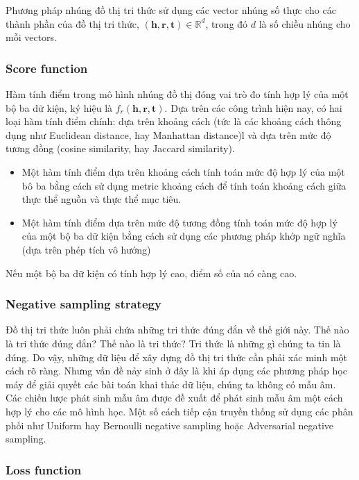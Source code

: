 Phương pháp nhúng đồ thị tri thức sử dụng các vector nhúng số thực cho các thành phần của đồ thị tri thức, $(\mathbf{h}, \mathbf{r}, \mathbf{t}) \in \mathbb{R}^d$, trong đó $d$ là số chiều nhúng cho mỗi vectors.

\subsubsection{Score function}

Hàm tính điểm trong mô hình nhúng đồ thị đóng vai trò đo tính hợp lý của một bộ ba dữ kiện, ký hiệu là $f_r(\mathbf{h}, \mathbf{r}, \mathbf{t})$. Dựa trên các công trình hiện nay, có hai loại hàm tính điểm chính: dựa trên khoảng cách (tức là các khoảng cách thông dụng như Euclidean distance, hay Manhattan distance)l và dựa trên mức độ tương đồng (cosine similarity, hay Jaccard similarity).
\begin{itemize}
    \item Một hàm tính điểm dựa trên khoảng cách tính toán mức độ hợp lý của một bô ba bằng cách sử dụng metric khoảng cách để tính toán khoảng cách giữa thực thể nguồn và thực thể mục tiêu.
    \item Một hàm tính điểm dựa trên mức độ tương đồng tính toán mức độ hợp lý của một bộ ba dữ kiện bằng cách sử dụng các phương pháp khớp ngữ nghĩa (dựa trên phép tích vô hướng)
\end{itemize}

Nếu một bộ ba dữ kiện có tính hợp lý cao, điểm số của nó càng cao.

\subsubsection{Negative sampling strategy}

Đồ thị tri thức luôn phải chứa những tri thức đúng đắn về thế giới này. Thế nào là tri thức đúng đắn? Thế nào là tri thức? Tri thức là những gì chúng ta tin là đúng. Do vậy, những dữ liệu để xây dựng đồ thị tri thức cần phải xác minh một cách rõ ràng. Nhưng vấn đề nảy sinh ở đây là khi áp dụng các phương pháp học máy để giải quyết các bài toán khai thác dữ liệu, chúng ta không có mẫu âm. Các chiến lược phát sinh mẫu âm được đề xuất để phát sinh mẫu âm một cách hợp lý cho các mô hình học. Một số cách tiếp cận truyền thống sử dụng các phân phối như Uniform hay Bernoulli negative sampling hoặc Adversarial negative sampling.

\subsubsection{Loss function}

